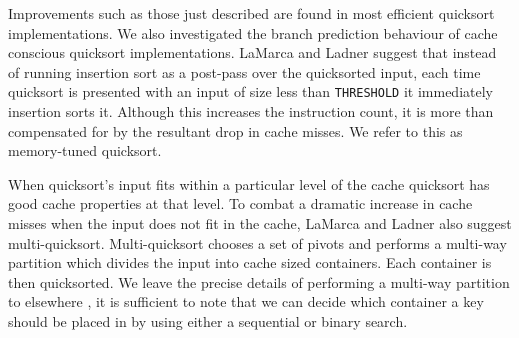 \documentclass[acmtocl]{acmtrans2m}
\begin{document}
Improvements such as those just described are found in most efficient quicksort
implementations. We also investigated the branch prediction behaviour of cache
conscious quicksort implementations. LaMarca and Ladner \citeyear{LaMarca97}
suggest that instead of running insertion sort as a post-pass over the
quicksorted input, each time quicksort is presented with an input of size less
than \texttt{THRESHOLD} it immediately insertion sorts it. Although this
increases the instruction count, it is more than compensated for by the
resultant drop in cache misses. We refer to this as memory-tuned quicksort.

When quicksort's input fits within a particular level of the cache quicksort has
good cache properties at that level. To combat a dramatic increase in cache
misses when the input does not fit in the cache, LaMarca and Ladner also suggest
multi-quicksort.  Multi-quicksort chooses a set of pivots and performs a
multi-way partition which divides the input into cache sized containers. Each
container is then quicksorted. We leave the precise details of performing a
multi-way partition to elsewhere \cite{LaMarca96a,BiggarGregg05}, it is
sufficient to note that we can decide which container a key should be placed in
by using either a sequential or binary search.
\end{document}
